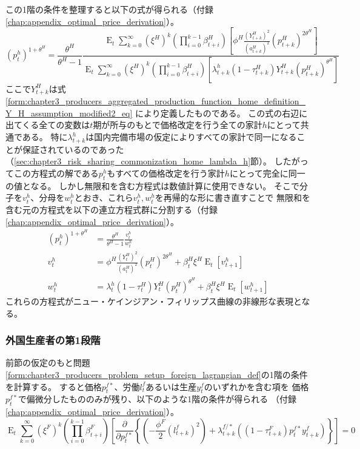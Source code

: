 この1階の条件を整理すると以下の式が得られる（付録\ref{chap:appendix_optimal_price_derivation}）。
\begin{equation}
\label{form:chapter3_producers_stage1_home_p_h_eq}
    (p_t^h)^{1+\theta^H}=\frac{\theta^H}{\theta^H-1}\frac{\operatorname{E}_t\sum_{k=0}^{\infty}(\xi^H)^k\left(\prod_{i=0}^{k-1}\beta_{t+i}^H\right)\left[\phi^H\frac{(Y_{t+k}^H)^2}{(a_{t+k}^H)^2}(p_{t+k}^H)^{2\theta^H}\right]}{\operatorname{E}_t\sum_{k=0}^{\infty}(\xi^H)^k\left(\prod_{i=0}^{k-1}\beta_{t+i}^H\right)\left[\lambda_{t+k}^h(1-\tau_{t+k}^H)Y_{t+k}^H(p_{t+k}^H)^{\theta^H}\right]}
\end{equation}
ここで\(Y_{t+k}^H\)は式
\eqref{form:chapter3_producers_aggregated_production_function_home_definition_Y_H_assumption_modified2_eq}
により定義したものである。
この式の右辺に出てくる全ての変数は\(t\)期が所与のもとで価格改定を行う全ての家計\(h\)にとって共通である。
特に\(\lambda_{t+k}^h\)は国内完備市場の仮定によりすべての家計で同一になることが保証されているのであった
（\ref{sec:chapter3_risk_sharing_commonization_home_lambda_h}節）。
したがってこの方程式の解である\(p_t^h\)もすべての価格改定を行う家計\(h\)にとって完全に同一の値となる。
しかし無限和を含む方程式は数値計算に使用できない。
そこで分子を\(v_t^h\)、分母を\(w_t^h\)とおき、これら\(v_t^h, w_t^h\)を再帰的な形に書き直すことで
無限和を含む元の方程式を以下の連立方程式群に分割する（付録\ref{chap:appendix_optimal_price_derivation}）。
\begin{align}
    \label{form:chapter3_producers_stage1_home_p_h_modified_eq}
        (p_t^h)^{1+\theta^H}&=\frac{\theta^H}{\theta^H-1}\frac{v_t^h}{w_t^h} \\
    \label{form:chapter3_producers_stage1_home_v_h_eq}
        v_t^h&=\phi^H\frac{(Y_t^H)^2}{(a_t^H)^2}(p_t^H)^{2\theta^H}+\beta_t^H\xi^H\operatorname{E}_t[v_{t+1}^h] \\
    \label{form:chapter3_producers_stage1_home_w_h_eq}
        w_t^h&=\lambda_t^h(1-\tau_t^H)Y_t^H(p_t^H)^{\theta^H}+\beta_t^H\xi^H\operatorname{E}_t[w_{t+1}^h]
\end{align}
これらの方程式がニュー・ケインジアン・フィリップス曲線の非線形な表現となる。

\subsubsection{外国生産者の第1段階}
\label{sec:chapter3_producers_stage1_foreign}
前節の仮定のもと問題\ref{form:chapter3_producers_problem_setup_foreign_lagrangian_def}の1階の条件を計算する。
すると価格\(p_t^{f*}\)、労働\(l_t^f\)あるいは生産\(y_t^f\)のいずれかを含む項を
価格\(p_t^{f*}\)で偏微分したもののみが残り、以下のような1階の条件が得られる
（付録\ref{chap:appendix_optimal_price_derivation}）。
\begin{equation}
\label{form:chapter3_producers_stage1_foreign_expectation_eq}
    \operatorname{E}_t\sum_{k=0}^{\infty}(\xi^F)^k\left(\prod_{i=0}^{k-1}\beta_{t+i}^F\right)\left[\frac{\partial}{\partial p_t^{f*}}\left\{\left(-\frac{\phi^F}{2}(l_{t+k}^f)^2\right)+\lambda_{t+k}^{f/*}\left((1-\tau_{t+k}^F)p_t^{f*}y_{t+k}^f\right)\right\}\right]=0
\end{equation}

